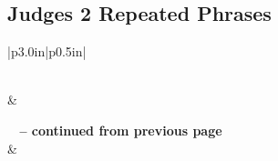 \subsection{Judges 2 Repeated Phrases}


\normalsize
 
\begin{center}
\begin{longtable}{|p{3.0in}|p{0.5in}|}
\caption[Judges 2 Repeated Phrases]{Judges 2 Repeated Phrases}\label{table:Repeated Phrases Judges 2} \\
\hline {} &  \\ \hline 
\endfirsthead
 
{{\bfseries \tablename\ \thetable{} -- continued from previous page}} \\  
\hline {} &  \\ \hline 
\endhead
 

\end{longtable}
\end{center}
